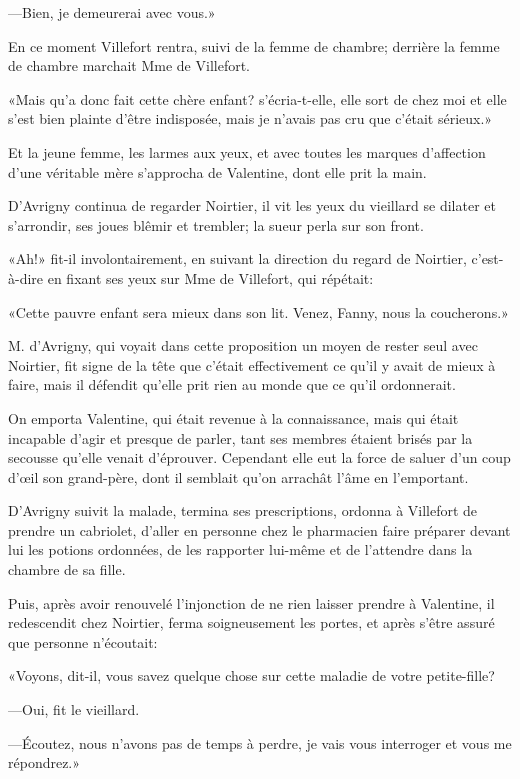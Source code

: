 —Bien, je demeurerai avec vous.» 

En ce moment Villefort rentra, suivi de la femme de chambre; derrière la femme de chambre marchait Mme de Villefort. 

«Mais qu'a donc fait cette chère enfant? s'écria-t-elle, elle sort de chez moi et elle s'est bien plainte d'être indisposée, mais je n'avais pas cru que c'était sérieux.» 

Et la jeune femme, les larmes aux yeux, et avec toutes les marques d'affection d'une véritable mère s'approcha de Valentine, dont elle prit la main. 

D'Avrigny continua de regarder Noirtier, il vit les yeux du vieillard se dilater et s'arrondir, ses joues blêmir et trembler; la sueur perla sur son front. 

«Ah!» fit-il involontairement, en suivant la direction du regard de Noirtier, c'est-à-dire en fixant ses yeux sur Mme de Villefort, qui répétait: 

«Cette pauvre enfant sera mieux dans son lit. Venez, Fanny, nous la coucherons.» 

M. d'Avrigny, qui voyait dans cette proposition un moyen de rester seul avec Noirtier, fit signe de la tête que c'était effectivement ce qu'il y avait de mieux à faire, mais il défendit qu'elle prit rien au monde que ce qu'il ordonnerait. 

On emporta Valentine, qui était revenue à la connaissance, mais qui était incapable d'agir et presque de parler, tant ses membres étaient brisés par la secousse qu'elle venait d'éprouver. Cependant elle eut la force de saluer d'un coup d'œil son grand-père, dont il semblait qu'on arrachât l'âme en l'emportant. 

D'Avrigny suivit la malade, termina ses prescriptions, ordonna à Villefort de prendre un cabriolet, d'aller en personne chez le pharmacien faire préparer devant lui les potions ordonnées, de les rapporter lui-même et de l'attendre dans la chambre de sa fille. 

Puis, après avoir renouvelé l'injonction de ne rien laisser prendre à Valentine, il redescendit chez Noirtier, ferma soigneusement les portes, et après s'être assuré que personne n'écoutait: 

«Voyons, dit-il, vous savez quelque chose sur cette maladie de votre petite-fille? 

—Oui, fit le vieillard. 

—Écoutez, nous n'avons pas de temps à perdre, je vais vous interroger et vous me répondrez.» 

